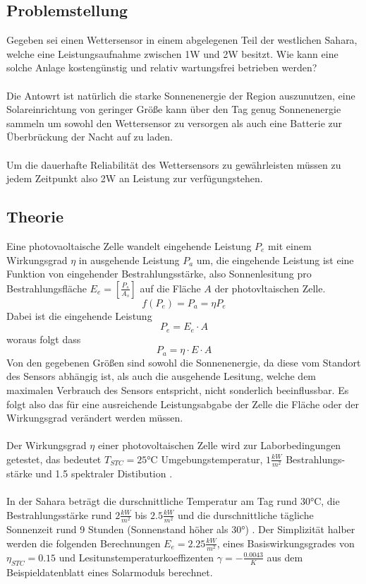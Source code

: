 \subsection{Problemstellung}
    Gegeben sei einen Wettersensor in einem abgelegenen Teil der
    westlichen Sahara, welche eine Leistungsaufnahme zwischen 1W und
    2W besitzt. Wie kann eine solche Anlage kostengünstig und relativ
    wartungsfrei betrieben werden?
    \\\\
    Die Antowrt ist natürlich die starke Sonnenenergie der Region
    auszunutzen, eine Solareinrichtung von geringer Größe kann über
    den Tag genug Sonnenenergie sammeln um sowohl den Wettersensor zu
    versorgen als auch eine Batterie zur Überbrückung der Nacht auf zu
    laden.
    \\\\
    Um die dauerhafte Reliabilität des Wettersensors zu gewährleisten
    müssen zu jedem Zeitpunkt also 2W an Leistung zur verfügungstehen.

\subsection{Theorie}
    Eine photovaoltaische Zelle wandelt eingehende Leistung \( P_e \)
    mit einem Wirkungsgrad \( \eta \) in ausgehende Leistung \( P_a \)
    um, die eingehende Leistung ist eine Funktion von eingehender
    Bestrahlungsstärke, also Sonnenlesitung pro Bestrahlungsfläche
    \( E_e = [\frac{P_s}{A_s}] \) auf die Fläche \( A \) der
    photovltaischen Zelle.
        \[ f(P_e) = P_a = \eta P_e \]
    Dabei ist die eingehende Leistung
        \[ P_e = E_e \cdot A\]
    woraus folgt dass
        \[ P_a = \eta \cdot E \cdot A \]
    Von den gegebenen Größen sind sowohl die Sonnenenergie, da diese
    vom Standort des Sensors abhängig ist, als auch die ausgehende
    Lesitung, welche dem maximalen Verbrauch des Sensors entspricht,
    nicht sonderlich beeinflussbar. Es folgt also das für eine
    ausreichende Leistungsabgabe der Zelle die Fläche oder der
    Wirkungsgrad verändert werden müssen.
    \\\\
    Der Wirkungsgrad \( \eta \) einer photovoltaischen Zelle wird zur
    Laborbedingungen getestet, das bedeutet \( T_{STC} = 25 \)°C
    Umgebungstemperatur, \( 1 \frac{kW}{m^2} \) Bestrahlungs-stärke und
    1.5 spektraler Distibution \cite{Wiki_SolarEfficiency}.
    \\\\
    In der Sahara beträgt die durschnittliche Temperatur am Tag rund
    30°C, die Bestrahlungsstärke rund \( 2 \frac{kW}{m^2} \) bis
    \( 2.5 \frac{kW}{m^2} \) und die durschnittliche tägliche Sonnenzeit
    rund 9 Stunden (Sonnenstand höher als 30°) \cite{Wiki_SolarAfrica,
    DateTimeWestSahara}. Der Simplizität halber werden die folgenden
    Berechnungen \( E_e = 2.25 \frac{kW}{m^2} \), eines
    Basiswirkungsgrades von \( \eta_{STC} = 0.15 \) und
    Lesitunstemperaturkoeffizenten \( \gamma = -\frac{0.0043}{K} \)
    aus dem Beispieldatenblatt eines Solarmoduls berechnet.
    \cite{SolarDatasheet}

